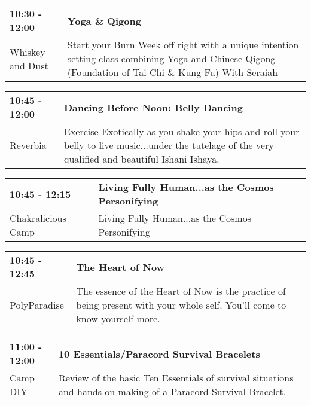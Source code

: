 \begin{tabular}{ p{1in} p{2.2in} }
    \textbf{10:30 - 12:00} & \textbf{Yoga \& Qigong} \\
    Whiskey and Dust \newline  & Start your Burn Week off right with a unique intention setting class combining Yoga and Chinese Qigong (Foundation of Tai Chi \& Kung Fu) With Seraiah \\
    \hline 
\end{tabular}
    
\begin{tabular}{ p{1in} p{2.2in} }
    \textbf{10:45 - 12:00} & \textbf{Dancing Before Noon: Belly Dancing} \\
    Reverbia \newline  & Exercise Exotically as you shake your hips and roll your belly to live music...under the tutelage of the very qualified and beautiful Ishani Ishaya. \\
    \hline 
\end{tabular}
    
\begin{tabular}{ p{1in} p{2.2in} }
    \textbf{10:45 - 12:15} & \textbf{Living Fully Human...as the Cosmos Personifying} \\
    Chakralicious Camp \newline  & Living Fully Human...as the Cosmos Personifying \\
    \hline 
\end{tabular}
    
\begin{tabular}{ p{1in} p{2.2in} }
    \textbf{10:45 - 12:45} & \textbf{The Heart of Now} \\
    PolyParadise \newline  & The essence of the Heart of Now is the practice of being present with your whole self. You'll come to know yourself more. \\
    \hline 
\end{tabular}
    
\begin{tabular}{ p{1in} p{2.2in} }
    \textbf{11:00 - 12:00} & \textbf{10 Essentials/Paracord Survival Bracelets} \\
    Camp DIY \newline  & Review of the basic Ten Essentials of survival situations and hands on making of a Paracord Survival Bracelet. \\
    \hline 
\end{tabular}
    
